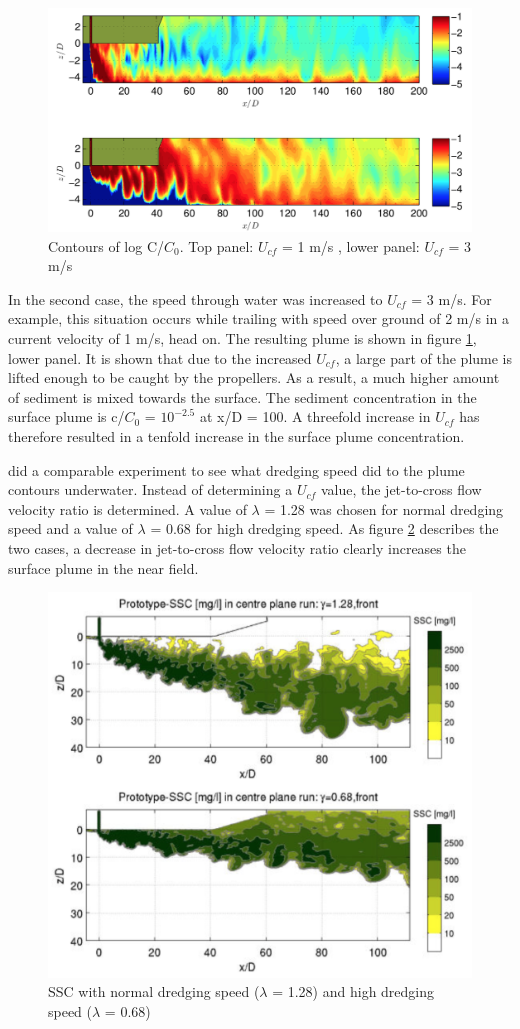 \begin{figure}[ht!]
    \centering
    \includegraphics[width = .8\linewidth]{Images/dreding_speed.png}
    \caption{Contours of log C/$C_0$. Top panel: $U_{cf}$ =  1 m/s , lower panel: $U_{cf}$ =  3 m/s}
    \label{fig:dredging_speed}
\end{figure}

\noindent In the second case, the speed through water was increased to $U_{cf}$ = 3 m/s. For example, this situation occurs while trailing with speed over ground of 2 m/s in a current velocity of 1 m/s, head on. The resulting plume is shown in figure \ref{fig:dredging_speed}, lower panel. It is shown that due to the increased $U_{cf}$, a large part of the plume is lifted enough to be caught by the propellers. As a result, a much higher amount of sediment is mixed towards the surface. The sediment concentration in the surface plume is c/$C_0$ =  $10^{-2.5}$ at x/D = 100. A threefold increase in $U_{cf}$ has therefore resulted in a tenfold increase in the surface plume concentration. \newline

\noindent \cite{Dewit} did a comparable experiment to see what dredging speed did to the plume contours underwater. Instead of determining a $U_{cf}$ value, the jet-to-cross flow velocity ratio is determined. A value of $\lambda$ =  1.28 was chosen for normal dredging speed and a value of $\lambda$ =  0.68 for high dredging speed. As figure \ref{fig:dredging_speed_2} describes the two cases, a decrease in jet-to-cross flow velocity ratio clearly increases the surface plume in the near field.

\begin{figure}[ht!]
    \centering
    \includegraphics[width = .6\linewidth]{Images/Dredging_speed.png}
    \caption{SSC with normal dredging speed ($\lambda$ = 1.28) and high dredging speed ($\lambda$ = 0.68)}
    \label{fig:dredging_speed_2}
\end{figure}

